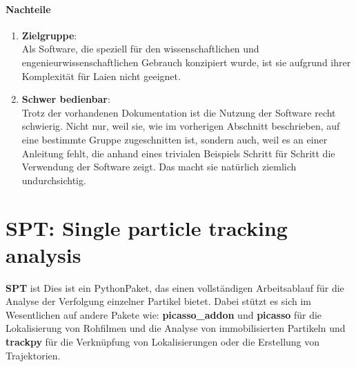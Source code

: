 	\paragraph{Nachteile}
		\begin{enumerate}
    			\item \textbf{Zielgruppe}:\\
				Als Software, die speziell für den wissenschaftlichen und engenieurwissenschaftlichen Gebrauch konzipiert wurde, ist sie aufgrund ihrer Komplexität für Laien nicht geeignet.
				
    			\item \textbf{Schwer bedienbar}:\\
				Trotz der vorhandenen Dokumentation ist die Nutzung der Software recht schwierig. Nicht nur, weil sie, wie im vorherigen Abschnitt beschrieben, auf eine bestimmte Gruppe zugeschnitten ist, sondern auch, weil es an einer Anleitung fehlt, die anhand eines trivialen Beispiels Schritt für Schritt die Verwendung der Software zeigt.
Das macht sie natürlich ziemlich undurchsichtig.
    			
		\end{enumerate}
		


\section{SPT: Single particle tracking analysis \label{kap1_STP}}
\textbf{SPT}\cite{spt_stehr_stein_2020} ist Dies ist ein Python\-Paket, das einen vollständigen Arbeitsablauf für die Analyse der Verfolgung einzelner Partikel bietet. Dabei stützt es sich im Wesentlichen auf andere Pakete wie: \textbf{picasso\_addon}\cite{picasso_addon_schwille-paint_2020} und \textbf{picasso} \cite{picasso_jungmannlab_2019} für die Lokalisierung von Rohfilmen und die Analyse von immobilisierten Partikeln und \textbf{trackpy}\cite{trackpy_allan_daniel_b_2021_4682814} für die Verknüpfung von Lokalisierungen oder die Erstellung von Trajektorien.

